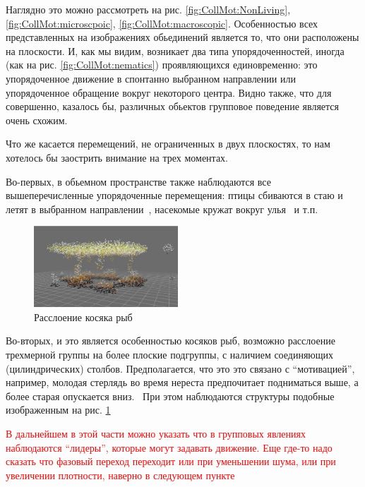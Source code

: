 	Наглядно это можно рассмотреть на рис. \ref{fig:CollMot:NonLiving}, \ref{fig:CollMot:microscpoic}, \ref{fig:CollMot:macroscopic}. Особенностью всех представленных на изображениях обьединений является то, что они расположены на плоскости. И, как мы видим, возникает два типа упорядоченностей, иногда (как на рис. \ref{fig:CollMot:nematics}) проявляющихся единовременно: это упорядоченное движение в спонтанно выбранном направлении или упорядоченное обращение вокруг некоторого центра. Видно также, что для совершенно, казалось бы, различных обьектов групповое поведение является очень схожим.

	Что же касается перемещений, не ограниченных в двух плоскостях, то нам хотелось бы заострить внимание на трех моментах. 

	Во-первых, в обьемном пространстве также наблюдаются все вышеперечисленные упорядоченные перемещения: птицы сбиваются в стаю и летят в выбранном направлении~\cite{dellariccia2008}, насекомые кружат вокруг улья~\cite{buhl2006} и т.п.

	\begin{figure}
	  \vspace{-20pt}
	  \begin{center}
	    \includegraphics[width=0.48\textwidth]{Images/Fig57_CollectiveMotion}
	  \end{center}
	  \vspace{-20pt}
	  \caption{Расслоение косяка рыб}
	  \label{fig:FishSplitting}
	  \vspace{-10pt}
	\end{figure}

	Во-вторых, и это является особенностью косяков рыб, возможно расслоение трехмерной группы на более плоские подгруппы, с наличием соединяющих (цилиндрических) столбов. Предполагается, что это это связано с ``мотивацией'', например, молодая стерлядь во время нереста предпочитает подниматься выше, а более старая опускается вниз.~\cite{axelsen2000} При этом наблюдаются структуры подобные изображенным на рис. \ref{fig:FishSplitting}

    \textcolor{red}{В дальнейшем в этой части можно указать что в групповых явлениях наблюдаются ``лидеры'', которые могут задавать движение. Еще где-то надо сказать что фазовый переход переходит или при уменьшении шума, или при увеличении плотности, наверно в следующем пункте}

